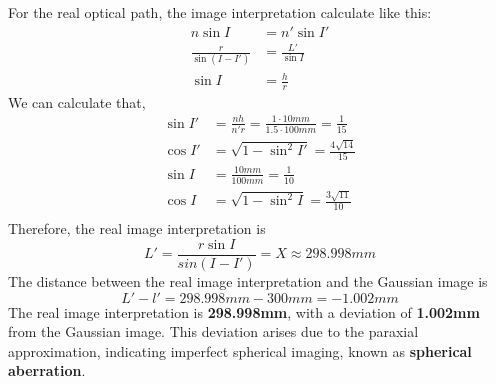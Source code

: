 \documentclass{article}
\begin{document}
For the real optical path, the image interpretation calculate like this:
\begin{align}
    n\sin I              & =n'\sin I'         \\
    \frac{r}{\sin(I-I')} & =\frac{L'}{\sin I} \\
    \sin I               & =\frac{h}{r}
\end{align}
We can calculate that,
\begin{align}
    \sin I' & =\frac{nh}{n'r} = \frac{1\cdot 10mm}{1.5\cdot 100mm}=\frac{1}{15} \\
    \cos I' & =\sqrt{1-\sin^2I'} = \frac{4\sqrt{14}}{15}                        \\
    \sin I  & = \frac{10mm}{100mm} = \frac{1}{10}                               \\
    \cos I  & = \sqrt{1-\sin^2I} = \frac{3\sqrt{11}}{10}                        \\
\end{align}
Therefore, the real image interpretation is
\begin{equation}
    \boxed{L' =\frac{r\sin I}{sin(I-I')} = X \approx 298.998mm}
\end{equation}
The distance between the real image interpretation and the Gaussian image is
\begin{equation}
    \boxed{L' - l' = 298.998mm - 300mm = -1.002mm}
\end{equation}
The real image interpretation is \textbf{298.998mm}, with a deviation of \textbf{1.002mm} from the Gaussian image. This deviation arises due to the paraxial approximation, indicating imperfect spherical imaging, known as \textbf{spherical aberration}.
\end{document}
